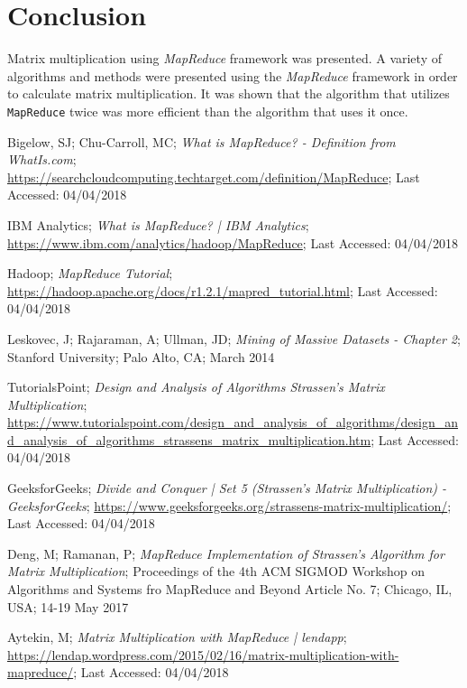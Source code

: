 \documentclass[10pt, conference]{IEEEtran}
\def\code#1{\texttt{#1}}
\begin{document}
\section{Conclusion}
\label{Conclusion}
Matrix multiplication using \emph{MapReduce} framework was presented. A variety of algorithms and methods were presented using the \emph{MapReduce} framework in order to calculate matrix multiplication. It was shown that the algorithm that utilizes \code{MapReduce} twice was more efficient than the algorithm that uses it once.


\begin{thebibliography}{}

Bigelow, SJ; Chu-Carroll, MC; \emph{What is MapReduce? - Definition from WhatIs.com}; \url{https://searchcloudcomputing.techtarget.com/definition/MapReduce}; Last Accessed: 04/04/2018

IBM Analytics; \emph{What is MapReduce? | IBM Analytics}; \url{https://www.ibm.com/analytics/hadoop/MapReduce}; Last Accessed: 04/04/2018

Hadoop; \emph{MapReduce Tutorial}; \url{https://hadoop.apache.org/docs/r1.2.1/mapred_tutorial.html}; Last Accessed: 04/04/2018

Leskovec, J; Rajaraman, A; Ullman, JD; \emph{Mining of Massive Datasets - Chapter 2}; Stanford University; Palo Alto, CA; March 2014

TutorialsPoint; \emph{Design and Analysis of Algorithms Strassen’s Matrix Multiplication}; \url{https://www.tutorialspoint.com/design_and_analysis_of_algorithms/design_and_analysis_of_algorithms_strassens_matrix_multiplication.htm}; Last Accessed: 04/04/2018

GeeksforGeeks; \emph{Divide and Conquer | Set 5 (Strassen's Matrix Multiplication) - GeeksforGeeks}; \url{https://www.geeksforgeeks.org/strassens-matrix-multiplication/}; Last Accessed: 04/04/2018

Deng, M; Ramanan, P; \emph{MapReduce Implementation of Strassen's Algorithm for Matrix Multiplication}; Proceedings of the 4th ACM SIGMOD Workshop on Algorithms and Systems fro MapReduce and Beyond Article No. 7; Chicago, IL, USA; 14-19 May 2017

Aytekin, M; \emph{Matrix Multiplication with MapReduce | lendapp}; \url{https://lendap.wordpress.com/2015/02/16/matrix-multiplication-with-mapreduce/}; Last Accessed: 04/04/2018

\end{thebibliography}




\end{document}
